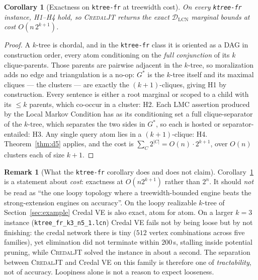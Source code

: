 \documentclass[11pt]{article}
\newtheorem{corollary}{Corollary}
\theoremstyle{definition}
\newtheorem{remark}{Remark}
\newcommand{\DLCN}{\mathcal{D}_{\mathrm{LCN}}}
\begin{document}
\begin{corollary}[Exactness on \texttt{ktree-fr} at treewidth cost]\label{cor:ktree}
On every \texttt{ktree-fr} instance, H1--H4 hold, so \textsc{CredalJT} returns
the exact $\DLCN$ marginal bounds at cost $O(n\,2^{k+1})$.
\end{corollary}

\begin{proof}
A $k$-tree is chordal, and in the \texttt{ktree-fr} class it is oriented as a DAG
in construction order, every atom conditioning on the \emph{full conjunction} of
its $k$ clique-parents. Those parents are pairwise adjacent in the $k$-tree, so
moralization adds no edge and triangulation is a no-op: $G^\ast$ is the $k$-tree
itself and its maximal cliques --- the clusters --- are exactly the
$(k{+}1)$-cliques, giving H1 by construction. Every sentence is either a root
marginal or scoped to a child with its $\le k$ parents, which co-occur in a
cluster: H2. Each LMC assertion produced by the Local Markov Condition has as its
conditioning set a full clique-separator of the $k$-tree, which separates the two
sides in $G^\ast$, so each is hosted or separator-entailed: H3. Any single query
atom lies in a $(k{+}1)$-clique: H4. Theorem~\ref{thm:d5} applies, and the cost
is $\sum_C2^{|C|}=O(n)\cdot2^{k+1}$, over $O(n)$ clusters each of size $k{+}1$.
\end{proof}

\begin{remark}[What the \texttt{ktree-fr} corollary does and does not claim]\label{rem:ktreehonest}
Corollary~\ref{cor:ktree} is a statement about \emph{cost}: exactness at
$O(n2^{k+1})$ rather than $2^n$. It should \emph{not} be read as ``the one loopy
topology where a treewidth-bounded engine beats the strong-extension engines on
accuracy''. On the loopy realizable $k$-tree of Section~\ref{sec:example} Credal
VE is also exact, atom for atom. On a larger $k{=}3$ instance
(\texttt{ktree\_fr\_k3\_n5\_1.lcn}) Credal VE fails not by being loose but by not
finishing: the credal network there is tiny ($512$ vertex combinations across
five families), yet elimination did not terminate within $200$\,s, stalling
inside potential pruning, while \textsc{CredalJT} solved the instance in about a
second. The separation between \textsc{CredalJT} and Credal VE on this family is
therefore one of \emph{tractability}, not of accuracy. Loopiness alone is not a
reason to expect looseness.
\end{remark}
\end{document}
